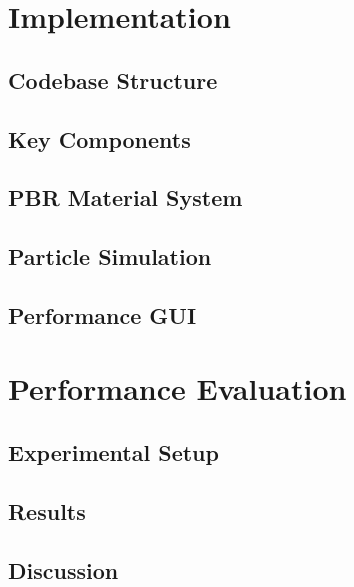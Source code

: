 \documentclass[12pt,a4paper,openright,twoside]{book}
\begin{document}
\chapter{Implementation}
\label{chap:implementation}

\section{Codebase Structure}

\section{Key Components}

\section{PBR Material System}

\section{Particle Simulation}

\section{Performance GUI}

\chapter{Performance Evaluation}
\label{chap:evaluation}

\section{Experimental Setup}

\section{Results}

\section{Discussion}

\end{document}
